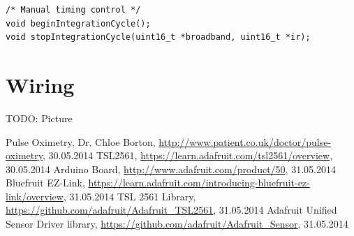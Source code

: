 \documentclass[notitlepage]{scrreprt}
\begin{document}
\begin{lstlisting}[caption=Adafruit\_TSL2561\_U.h]
/* Manual timing control */
void beginIntegrationCycle();
void stopIntegrationCycle(uint16_t *broadband, uint16_t *ir);
\end{lstlisting}

\section{Wiring}
\label{sec:wiring}
TODO: Picture

\begin{thebibliography}{999}
	 Pulse Oximetry, Dr. Chloe Borton, \url{http://www.patient.co.uk/doctor/pulse-oximetry}, 30.05.2014
	 TSL2561, \url{https://learn.adafruit.com/tsl2561/overview}, 30.05.2014
	 Arduino Board, \url{http://www.adafruit.com/product/50}, 31.05.2014
	 Bluefruit EZ-Link, \url{https://learn.adafruit.com/introducing-bluefruit-ez-link/overview}, 31.05.2014
	 TSL 2561 Library, \url{https://github.com/adafruit/Adafruit_TSL2561}, 31.05.2014
	 Adafruit Unified Sensor Driver library, \url{https://github.com/adafruit/Adafruit_Sensor}, 31.05.2014
\end{thebibliography}
\end{document}
